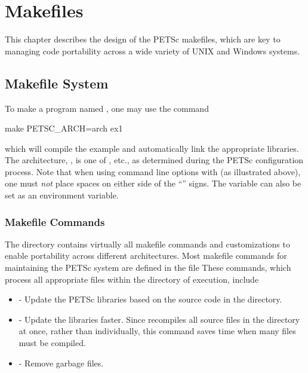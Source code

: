 {{{%
\cleardoublepage
\chapter{Makefiles}
\label{ch_makefiles}

This chapter describes the design of the PETSc makefiles, which are
key to managing code portability across a wide variety of UNIX and Windows systems.

\section{Makefile System}

To make a program named , one may use the command
\begin{bashlisting}
make PETSC_ARCH=arch ex1
\end{bashlisting}
which will compile the
example and automatically link the appropriate libraries.  The
architecture, , is one of , etc., as determined during the PETSc configuration process.
Note that when using command line options with  (as illustrated above),
one must {\em not} place spaces on either side of the ``\trl{=}'' signs.
The variable  can also be set as an environment
variable.

\subsection{Makefile Commands} \label{sec_common}

The directory 
contains virtually all
makefile commands and customizations to enable portability across
different architectures.  Most makefile commands for maintaining the
PETSc system are defined in the file 
These commands, which process all appropriate files within the
directory of execution, include
\begin{itemize}
\item {} - Update the PETSc libraries based on the source code
      in the directory.
\item {} - Update the libraries faster.  Since
       recompiles all source files in the directory at once,
      rather than individually, this command saves time when many files
      must be compiled.
\item {} - Remove garbage files.
\end{itemize}

}}}
